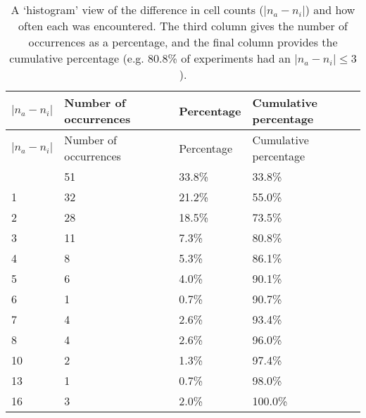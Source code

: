 \startrowcolors
\begin{longtable}{l|l|l|l}
\caption{A `histogram' view of the difference in cell counts ($|n_a - n_i|$) and how
often each was encountered.
The third column gives the number of occurrences as a percentage, and the
final column provides the cumulative percentage (e.g. 80.8\% of
experiments had an $|n_a - n_i| \leq 3$).} \\
\hline
\rowcolor{white}
$|n_a - n_i|$ & Number of occurrences & Percentage & Cumulative percentage\\ \hline
\endfirsthead
\hline
\rowcolor{white}
$|n_a - n_i|$ & Number of occurrences & Percentage & Cumulative percentage\\ \hline
\endhead
\hline
\endfoot
 0 & 51 & 33.8\% &  33.8\% \\
 1 & 32 & 21.2\% &  55.0\% \\
 2 & 28 & 18.5\% &  73.5\% \\
 3 & 11 &  7.3\% &  80.8\% \\
 4 &  8 &  5.3\% &  86.1\% \\
 5 &  6 &  4.0\% &  90.1\% \\
 6 &  1 &  0.7\% &  90.7\% \\
 7 &  4 &  2.6\% &  93.4\% \\
 8 &  4 &  2.6\% &  96.0\% \\
10 &  2 &  1.3\% &  97.4\% \\
13 &  1 &  0.7\% &  98.0\% \\
16 &  3 &  2.0\% & 100.0\% \\
\end{longtable}
